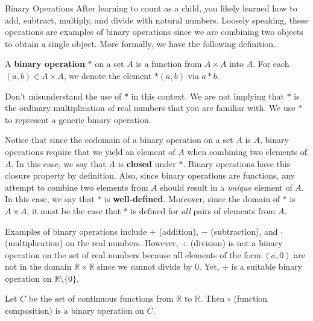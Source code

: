\begin{section}{Binary Operations}
After learning to count as a child, you likely learned how to add, subtract, multiply, and divide with natural numbers.  Loosely speaking, these operations are examples of binary operations since we are combining two objects to obtain a single object.  More formally, we have the following definition.

\begin{definition}
A \textbf{binary operation} \(*\) on a set \(A\) is a function from \(A\times A\) into \(A\).  For each \((a,b)\in A\times A\), we denote the element \(*(a,b)\) via \(a*b\).
\end{definition}

\begin{remark}
Don't misunderstand the use of \(*\) in this context.  We are not implying that \(*\) is the ordinary multiplication of real numbers that you are familiar with.  We use \(*\) to represent a generic binary operation.  
\end{remark}

\begin{remark}
Notice that since the codomain of a binary operation on a set \(A\) is \(A\), binary operations require that we yield an element of \(A\) when combining two elements of \(A\).  In this case, we say that \(A\) is \textbf{closed} under \(*\).  Binary operations have this closure property by definition.  Also, since binary operations are functions, any attempt to combine two elements from \(A\) should result in a \emph{unique} element of \(A\).  In this case, we say that \(*\) is \textbf{well-defined}.  Moreover, since the domain of \(*\) is \(A\times A\), it must be the case that \(*\) is defined for \emph{all} pairs of elements from \(A\).
\end{remark}

\begin{example}
Examples of binary operations include \(+\) (addition), \(-\) (subtraction), and \(\cdot\) (multiplication) on the real numbers.  However, \(\div\) (division) is not a binary operation on the set of real numbers because all elements of the form \((a,0)\) are not in the domain \(\mathbb{R}\times \mathbb{R}\) since we cannot divide by 0.  Yet, \(\div\) is a suitable binary operation on \(\mathbb{R}\setminus \{0\}\).
\end{example}

\begin{example}
Let \(C\) be the set of continuous functions from \(\mathbb{R}\) to \(\mathbb{R}\).  Then \(\circ\) (function composition) is a binary operation on \(C\).
\end{example}


\end{section}
